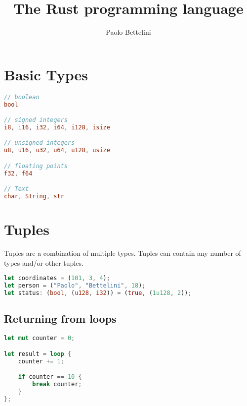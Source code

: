 \documentclass{article}
\title{The Rust programming language}
\author{Paolo Bettelini}
\date{}
\begin{document}
\maketitle
\tableofcontents
\pagebreak

\section{Basic Types}


\begin{lstlisting}[language=Rust, style=boxed, numbers=none]
// boolean
bool

// signed integers
i8, i16, i32, i64, i128, isize

// unsigned integers
u8, u16, u32, u64, u128, usize

// floating points
f32, f64

// Text
char, String, str
\end{lstlisting}

\section{Tuples}

Tuples are a combination of multiple types.
Tuples can contain any number of types and/or other tuples.

\begin{lstlisting}[language=Rust, style=boxed, numbers=none]
let coordinates = (101, 3, 4);
let person = ("Paolo", "Bettelini", 18);
let status: (bool, (u128, i32)) = (true, (1u128, 2));
\end{lstlisting}

\subsection{Returning from loops}

\begin{lstlisting}[language=Rust, style=boxed, numbers=none]
let mut counter = 0;

let result = loop {
    counter += 1;

    if counter == 10 {
        break counter;
    }
};
\end{lstlisting}
\end{document}
